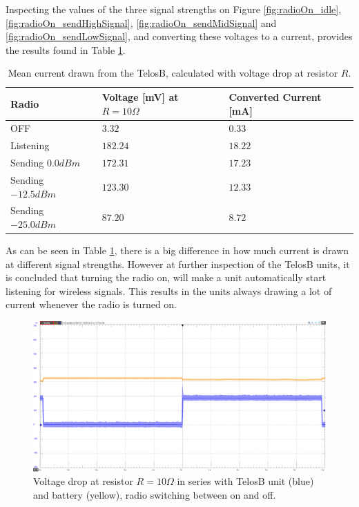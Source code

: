 \noindent Inspecting the values of the three signal strengths on Figure \ref{fig:radioOn_idle}, \ref{fig:radioOn_sendHighSignal}, \ref{fig:radioOn_sendMidSignal} and \ref{fig:radioOn_sendLowSignal}, and converting these voltages to a current, provides the results found in Table \ref{tab:signalStrengthEnergyConsumption}.

\begin{table}[h]
	\centering
	\begin{tabularx}{\linewidth}{|X|X|X|}
		\hline
		Radio				& Voltage [mV] at $R=10\Omega$	& Converted Current [mA]	\\ \hline
		OFF					& $3.32$						& $0.33$					\\ \hline
		Listening			& $182.24$						& $18.22$					\\ \hline
		Sending $0.0dBm$	& $172.31$						& $17.23$					\\ \hline
		Sending $-12.5dBm$	& $123.30$						& $12.33$					\\ \hline
		Sending $-25.0dBm$	& $87.20$						& $8.72$					\\ \hline
	\end{tabularx}
	\caption{Mean current drawn from the TelosB, calculated with voltage drop at resistor $R$.}
	\label{tab:signalStrengthEnergyConsumption}
\end{table}

\noindent As can be seen in Table \ref{tab:signalStrengthEnergyConsumption}, there is a big difference in how much current is drawn at different signal strengths. However at further inspection of the TelosB units, it is concluded that turning the radio on, will make a unit automatically start listening for wireless signals. This results in the units always drawing a lot of current whenever the radio is turned on.

\begin{figure}[h]
	\centering
	\includegraphics[width=\linewidth]{implementation/energylab/fig/radioSwitching.png}
	\caption{Voltage drop at resistor $R=10\Omega$ in series with TelosB unit (blue) and battery (yellow), radio switching between on and off.}
	\label{fig:radioSwitching}
\end{figure}

